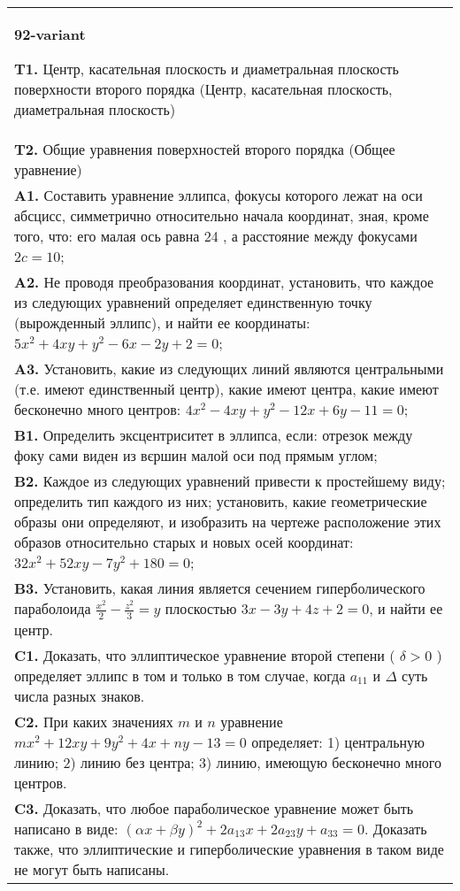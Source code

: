 \documentclass{article}
\begin{document}
\begin{tabular}{m{17cm}}
\textbf{92-variant}
\newline

\textbf{T1.} Центр, касательная плоскость и диаметральная плоскость поверхности второго порядка (Центр, касательная плоскость, диаметральная плоскость) \\
\textbf{T2.} Общие уравнения поверхностей второго порядка (Общее уравнение) \\
\textbf{A1.} Составить уравнение эллипса, фокусы которого лежат на оси абсцисс, симметрично относительно начала координат, зная, кроме того, что: его малая ось равна 24 , а расстояние между фокусами $2 c=10$; \\
\textbf{A2.} Не проводя преобразования координат, установить, что каждое из следующих уравнений определяет единственную точку (вырожденный эллипс), и найти ее координаты: $5 x^2+4 x y+y^2-6 x-2 y+2=0$; \\
\textbf{A3.} Установить, какие из следующих линий являются центральными (т.е. имеют единственный центр), какие имеют центра, какие имеют бесконечно много центров: $4 x^2-4 x y+y^2-12 x+6 y-11=0$; \\
\textbf{B1.} Определить эксцентриситет в эллипса, если: отрезок между фоку сами виден из вєршин малой оси под прямым углом; \\
\textbf{B2.} Каждое из следующих уравнений привести к простейшему виду; определить тип каждого из них; установить, какие геометрические образы они определяют, и изобразить на чертеже расположение этих образов относительно старых и новых осей координат: $32 x^2+52 x y-7 y^2+180=0$; \\
\textbf{B3.} Установить, какая линия является сечением гиперболического параболоида $\frac{x^2}{2}-\frac{z^2}{3}=y$ плоскостью $3 x-3 y+4 z+2=0$, и найти ее центр. \\
\textbf{C1.} Доказать, что эллиптическое уравнение второй степени ( $\delta>0$ ) определяет эллипс в том и только в том случае, когда $a_{11}$ и $\Delta$ суть числа разных знаков. \\
\textbf{C2.} При каких значениях $m$ и $n$ уравнение $m x^2+12 x y+9 y^2+4 x+n y-13=0$ определяет: 1) центральную линию; 2) линию без центра; 3) линию, имеющую бесконечно много центров. \\
\textbf{C3.} Доказать, что любое параболическое уравнение может быть написано в виде: $ (\alpha x+\beta y) ^2+2a_{13}x+2a_{23}y+a_{33}=0$. Доказать также, что эллиптические и гиперболические уравнения в таком виде не могут быть написаны. \\

\end{tabular}
\vspace{1cm}
\end{document}
